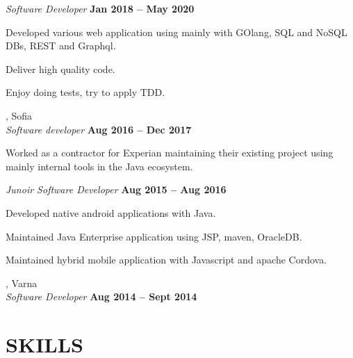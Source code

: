 \documentclass[margin,line]{resume}
\begin{document}
\begin{resume}
\begin{list2}
    \end{list2}

    \textsl{Software Developer} \hfill \textbf{Jan 2018 {--} May 2020}\\
    \begin{list2}
        \item Developed various web application using mainly with
          GOlang, SQL and NoSQL DBs, REST and Graphql.
	\item Deliver high quality code.\@
          \item Enjoy doing tests, try to apply TDD.\@
    \end{list2}

    \textbf{}, Sofia \vspace{2mm}\\\vspace{1mm}%
    \textsl{Software developer} \hfill \textbf{Aug 2016 {--} Dec 2017}\\
    \begin{list2}
        \item Worked as a contractor for Experian maintaining their
          existing project using mainly internal tools in the Java
          ecosystem.
    \end{list2}

    \textsl{Junoir Software Developer} \hfill \textbf{Aug 2015 {--} Aug 2016}\\
    \begin{list2}
        \item Developed native android applications with Java.
	\item Maintained Java Enterprise application using JSP, maven, OracleDB.\@
        \item Maintained hybrid mobile application with Javascript and apache Cordova.
    \end{list2}

    \textbf{}, Varna \vspace{2mm}\\\vspace{1mm}%
    \textsl{Software Developer} \hfill \textbf{Aug 2014 {--} Sept 2014}


\sectionline%

    \section{\mysidestyle\textbf{\large{S}\small{KILLS}}}


\end{resume}
\end{document}
